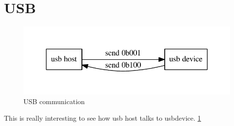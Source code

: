 \documentclass{article}
\begin{document}
\section{USB}
\begin{figure}
\includegraphics[bb = 0 10 100 100]{horizontal_inc.pdf}
\caption{USB communication}
\label{fig:usbcomm}
\end{figure}
This is really interesting to see how usb host talks to 
usbdevice. \ref{fig:usbcomm}
\end{document}
